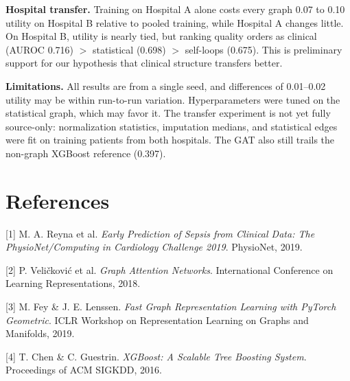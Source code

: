 \documentclass{article}
\begin{document}
\textbf{Hospital transfer.} Training on Hospital A alone costs every graph 0.07 to 0.10 utility on Hospital B relative to pooled training, while Hospital A changes little. On Hospital B, utility is nearly tied, but ranking quality orders as clinical (AUROC 0.716) $>$ statistical (0.698) $>$ self-loops (0.675). This is preliminary support for our hypothesis that clinical structure transfers better.
 
\textbf{Limitations.} All results are from a single seed, and differences of 0.01--0.02 utility may be within run-to-run variation. Hyperparameters were tuned on the statistical graph, which may favor it. The transfer experiment is not yet fully source-only: normalization statistics, imputation medians, and statistical edges were fit on training patients from both hospitals. The GAT also still trails the non-graph XGBoost reference (0.397).

\newpage
\section*{References}

[1] M. A. Reyna et al. \textit{Early Prediction of Sepsis from Clinical Data: The PhysioNet/Computing in Cardiology Challenge 2019}. PhysioNet, 2019.

[2] P. Veličković et al. \textit{Graph Attention Networks}. International Conference on Learning Representations, 2018.

[3]  M. Fey \& J. E. Lenssen. \textit{Fast Graph Representation Learning with PyTorch Geometric}. ICLR Workshop on Representation Learning on Graphs and Manifolds, 2019.

[4] T. Chen \& C. Guestrin. \textit{XGBoost: A Scalable Tree Boosting System}. Proceedings of ACM SIGKDD, 2016.

\end{document}

